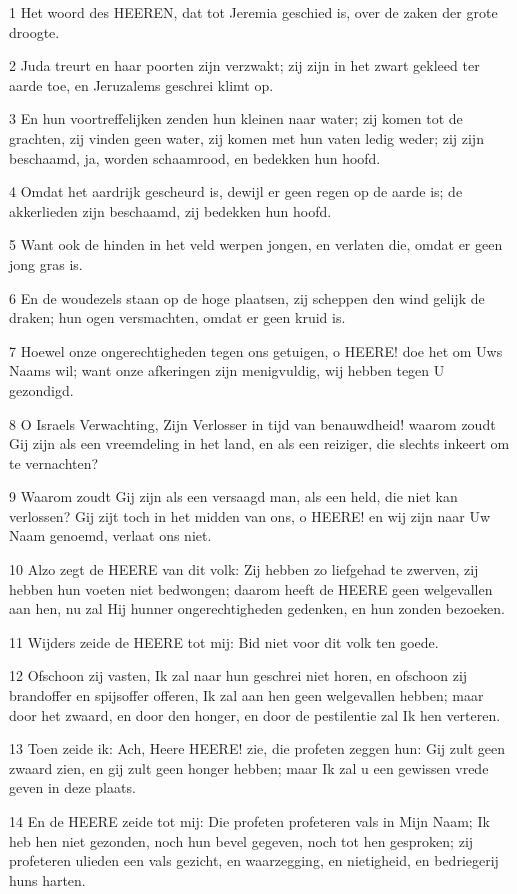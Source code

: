 \par 1 Het woord des HEEREN, dat tot Jeremia geschied is, over de zaken der grote droogte.
\par 2 Juda treurt en haar poorten zijn verzwakt; zij zijn in het zwart gekleed ter aarde toe, en Jeruzalems geschrei klimt op.
\par 3 En hun voortreffelijken zenden hun kleinen naar water; zij komen tot de grachten, zij vinden geen water, zij komen met hun vaten ledig weder; zij zijn beschaamd, ja, worden schaamrood, en bedekken hun hoofd.
\par 4 Omdat het aardrijk gescheurd is, dewijl er geen regen op de aarde is; de akkerlieden zijn beschaamd, zij bedekken hun hoofd.
\par 5 Want ook de hinden in het veld werpen jongen, en verlaten die, omdat er geen jong gras is.
\par 6 En de woudezels staan op de hoge plaatsen, zij scheppen den wind gelijk de draken; hun ogen versmachten, omdat er geen kruid is.
\par 7 Hoewel onze ongerechtigheden tegen ons getuigen, o HEERE! doe het om Uws Naams wil; want onze afkeringen zijn menigvuldig, wij hebben tegen U gezondigd.
\par 8 O Israels Verwachting, Zijn Verlosser in tijd van benauwdheid! waarom zoudt Gij zijn als een vreemdeling in het land, en als een reiziger, die slechts inkeert om te vernachten?
\par 9 Waarom zoudt Gij zijn als een versaagd man, als een held, die niet kan verlossen? Gij zijt toch in het midden van ons, o HEERE! en wij zijn naar Uw Naam genoemd, verlaat ons niet.
\par 10 Alzo zegt de HEERE van dit volk: Zij hebben zo liefgehad te zwerven, zij hebben hun voeten niet bedwongen; daarom heeft de HEERE geen welgevallen aan hen, nu zal Hij hunner ongerechtigheden gedenken, en hun zonden bezoeken.
\par 11 Wijders zeide de HEERE tot mij: Bid niet voor dit volk ten goede.
\par 12 Ofschoon zij vasten, Ik zal naar hun geschrei niet horen, en ofschoon zij brandoffer en spijsoffer offeren, Ik zal aan hen geen welgevallen hebben; maar door het zwaard, en door den honger, en door de pestilentie zal Ik hen verteren.
\par 13 Toen zeide ik: Ach, Heere HEERE! zie, die profeten zeggen hun: Gij zult geen zwaard zien, en gij zult geen honger hebben; maar Ik zal u een gewissen vrede geven in deze plaats.
\par 14 En de HEERE zeide tot mij: Die profeten profeteren vals in Mijn Naam; Ik heb hen niet gezonden, noch hun bevel gegeven, noch tot hen gesproken; zij profeteren ulieden een vals gezicht, en waarzegging, en nietigheid, en bedriegerij huns harten.
